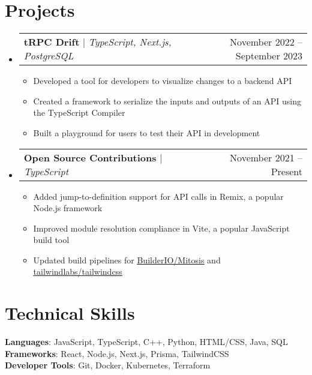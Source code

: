 \documentclass[letterpaper,11pt]{article}
\makeatletter
\newcommand{\resumeItem}[1]{
  \item\small{
    {#1 \vspace{-2pt}}
  }
}
\newcommand{\resumeProjectHeading}[2]{
    \item
    \begin{tabular*}{0.97\textwidth}{l@{\extracolsep{\fill}}r}
      \small#1 & #2 \\
    \end{tabular*}\vspace{-7pt}
}
\newcommand{\resumeSubHeadingListStart}{\begin{itemize}[leftmargin=0.15in, label={}]}
\newcommand{\resumeSubHeadingListEnd}{\end{itemize}}
\newcommand{\resumeItemListStart}{\begin{itemize}}
\newcommand{\resumeItemListEnd}{\end{itemize}\vspace{-5pt}}
\makeatother
\begin{document}
\section{Projects}
    \resumeSubHeadingListStart
      \resumeProjectHeading
          {\textbf{tRPC Drift} $|$ \emph{TypeScript, Next.js, PostgreSQL}}{November 2022 -- September 2023}
          \resumeItemListStart
            \resumeItem{Developed a tool for developers to visualize changes to a backend API}
            \resumeItem{Created a framework to serialize the inputs and outputs of an API using the TypeScript Compiler}
            \resumeItem{Built a playground for users to test their API in development}
          \resumeItemListEnd
      \resumeProjectHeading
          {\textbf{Open Source Contributions} $|$ \emph{TypeScript}}{November 2021 -- Present}
          \resumeItemListStart
            \resumeItem{Added jump-to-definition support for API calls in Remix, a popular Node.js framework}
            \resumeItem{Improved module resolution compliance in Vite, a popular JavaScript build tool}
            \resumeItem{Updated build pipelines for \href{https://github.com/BuilderIO/mitosis/pulls?q=is\%3Apr+author\%3Asachinraja}{\underline{BuilderIO/Mitosis}} and \href{https://github.com/tailwindlabs/tailwindcss/pulls?q=is\%3Apr+author\%3Asachinraja}{\underline{tailwindlabs/tailwindcss}} }
          \resumeItemListEnd
    \resumeSubHeadingListEnd



%
\section{Technical Skills}
 \begin{itemize}[leftmargin=0.15in, label={}]
    \small{\item{
     \textbf{Languages}{: JavaScript, TypeScript, C++, Python, HTML/CSS, Java, SQL} \\
     \textbf{Frameworks}{: React, Node.js, Next.js, Prisma, TailwindCSS } \\
     \textbf{Developer Tools}{: Git, Docker, Kubernetes, Terraform}
    }}
 \end{itemize}


\end{document}
